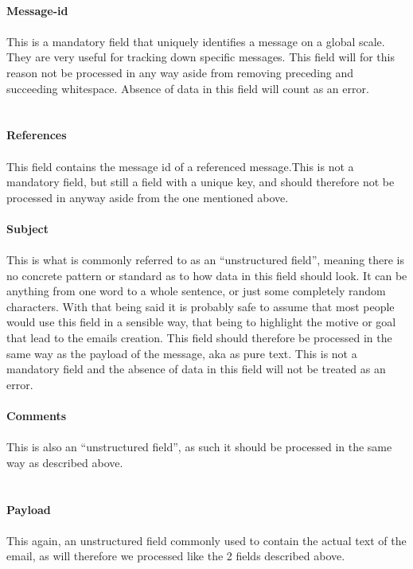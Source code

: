 \documentclass{report}
\begin{document}
\noindent
\\\textbf{Message-id} \\\\
This is a mandatory field that uniquely identifies a message on a global scale. They are very useful for tracking down specific messages. This field will for this reason not be processed in any way aside from removing preceding and succeeding whitespace. 
Absence of data in this field will count as an error.\\\\
\noindent
\\\textbf{References}\\\\
This field contains the message id of a referenced message.This is not a mandatory field, but still a field with a unique key, and should therefore not be processed in anyway aside from the one mentioned above.\\\\

\noindent
\textbf{Subject}\\\\
This is what is commonly referred to as an “unstructured field”, meaning there is no concrete pattern or standard as to how data in this field should look. It can be anything from one word to a whole sentence, or just some completely random characters. With that being said it is probably safe to assume that most people would use this field in a sensible way, that being to highlight the motive or goal that lead to the emails creation.
This field should therefore be processed in the same way as the payload of the message, aka as pure text.
This is not a mandatory field and the absence of data in this field will not be treated as an error.\\\\

\noindent
\textbf{Comments} \\\\
This is also an “unstructured field”, as such it should be processed in the same way as described above.\\\\\\
\noindent
\textbf{Payload} \\\\
This again, an unstructured field commonly used to contain the actual text of the email, as will therefore we processed like the 2 fields described above.\\
\end{document}
